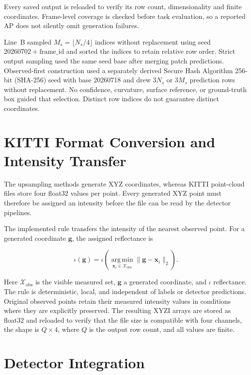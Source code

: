 Every saved output is reloaded to verify its row count, dimensionality
and finite coordinates. Frame-level coverage is checked before task
evaluation, so a reported AP does not silently omit generation failures.

Line~B sampled $M_s=\lfloor N_s/4\rfloor$ indices without replacement
using seed $20260702+\mathrm{frame\_id}$ and sorted the indices to retain
relative row order. Strict output sampling used the same seed base after
merging patch predictions. Observed-first construction used a separately derived Secure Hash Algorithm 256-bit (SHA-256) seed with base 20260718 and drew $3N_s$ or $3M_s$
prediction rows without replacement. No confidence, curvature, surface
reference, or ground-truth box guided that selection. Distinct row indices
do not guarantee distinct coordinates.

\section{KITTI Format Conversion and Intensity Transfer}
\label{sec:fc-4-7}

The upsampling methods generate XYZ coordinates, whereas KITTI point-cloud files store four float32 values per point. Every generated XYZ point must therefore be assigned an intensity before the file can be read by the detector pipelines.

The implemented rule transfers the intensity of the nearest observed
point. For a generated coordinate $\mathbf g$, the assigned reflectance is

\begin{equation}
\iota(\mathbf{g})=\iota\!\left(\operatorname*{arg\,min}_{\mathbf{x}_i\in\mathcal{X}_{\mathrm{obs}}}\|\mathbf{g}-\mathbf{x}_i\|_2\right).
\label{eq:fc-4-4}
\end{equation}

Here $\mathcal X_{\mathrm{obs}}$ is the visible measured set, $\mathbf g$ a generated coordinate, and $\iota$ reflectance. The rule is deterministic, local, and independent of labels or detector predictions. Original observed points retain their measured intensity values in conditions where they are explicitly preserved. The resulting XYZI arrays are stored as float32 and reloaded to verify that the file size is compatible with four channels, the shape is $Q\times4$, where $Q$ is the output row count, and all values are finite.

\section{Detector Integration}
\label{sec:fc-4-8}

